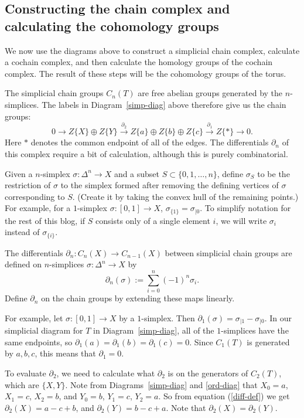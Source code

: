\documentclass[12pt,a4paper]{article}
\begin{document}
\subsection*{Constructing the chain complex and calculating the cohomology groups}

We now use the diagrams above to construct a simplicial chain complex, calculate a cochain complex, and then calculate the homology groups of the cochain complex. The result of these steps will be the cohomology groups of the torus.

The simplicial chain groups $C_n(T)$ are free abelian groups generated by the $n$-simplices. The labels in Diagram~\ref{simp-diag} above therefore give us the chain groups:
\[
0 \rightarrow Z\{X\} \oplus Z\{Y\} \xrightarrow{\partial_2} Z\{a\} \oplus Z\{ b \} \oplus Z \{c\} \xrightarrow{\partial_1} Z\{*\} \rightarrow 0.
\]
Here $*$ denotes the common endpoint of all of the edges. The differentials $\partial_n$ of this complex require a bit of calculation, although this is purely combinatorial.

Given a $n$-simplex $\sigma : \Delta^n \rightarrow X$ and a subset $S \subset \{ 0, 1, \ldots, n \}$, define $\sigma_S$ to be the restriction of $\sigma$ to the simplex formed after removing the defining vertices of $\sigma$ corresponding to $S$. (Create it by taking the convex hull of the remaining points.) For example, for a $1$-simplex $\sigma : [0,1] \rightarrow X$, $\sigma_{\{1\}} = \sigma_{|0}$. To simplify notation for the rest of this blog, if $S$ consists only of a single element $i$, we will write $\sigma_i$ instead of $\sigma_{\{i\}}$.

The differentials $\partial_n:C_n(X) \rightarrow C_{n-1}(X)$ between simplicial chain groups are defined on $n$-simplices $\sigma : \Delta^n \rightarrow X$ by
\begin{equation}
  \label{diff-def}
  \partial_n (\sigma) := \sum_{i = 0}^n (-1)^n \sigma_{i}.
\end{equation}
Define $\partial_n$ on the chain groups by extending these maps linearly.

For example, let $\sigma : [0,1] \rightarrow X$ by a $1$-simplex. Then $\partial_1(\sigma) = \sigma_{|1} - \sigma_{|0}$. In our simplicial diagram for $T$ in Diagram~\ref{simp-diag}, all of the $1$-simplices have the same endpoints, so $\partial_1(a) = \partial_1(b) = \partial_1(c) = 0$. Since $C_1(T)$ is generated by $a,b,c$, this means that $\partial_1 = 0$.

To evaluate $\partial_2$, we need to calculate what $\partial_2$ is on the generators of $C_2(T)$, which are $\{ X,Y \}$. Note from Diagrams~\ref{simp-diag} and \ref{ord-diag} that $X_{0} = a$, $X_{1} = c$, $X_2 = b$, and $Y_0 = b$, $Y_1 = c$, $Y_2 = a$. So from equation (\ref{diff-def}) we get $\partial_2(X) = a - c + b$, and $\partial_2(Y) = b - c + a$. Note that $\partial_2(X) = \partial_2(Y)$.
\end{document}
